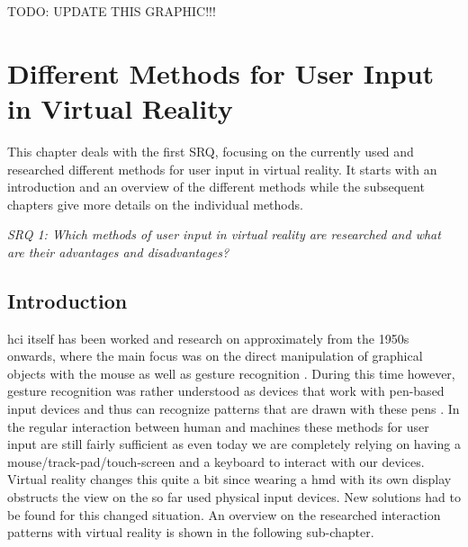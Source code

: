 TODO: UPDATE THIS GRAPHIC!!!



\section{Different Methods for User Input in Virtual Reality}

\label{SectionLiteratureReviewSRQ1}

This chapter deals with the first SRQ, focusing on the currently used and researched different methods for user input in virtual reality. It starts with an introduction and an overview of the different methods while the subsequent chapters give more details on the individual methods.
\begin{framed}
	\textit{SRQ 1: Which methods of user input in virtual reality are researched and what are their advantages and disadvantages?}
\end{framed}

\subsection{Introduction}

\gls{hci} itself has been worked and research on approximately from the 1950s onwards, where the main focus was on the direct manipulation of graphical objects with the mouse as well as gesture recognition \citep{Myers1998}. During this time however, gesture recognition was rather understood as devices that work with pen-based input devices and thus can recognize patterns that are drawn with these pens \citep{Myers1998}. In the regular interaction between human and machines these methods for user input are still fairly sufficient as even today we are completely relying on having a mouse/track-pad/touch-screen and a keyboard to interact with our devices. \newline
Virtual reality changes this quite a bit since wearing a \gls{hmd} with its own display obstructs the view on the so far used physical input devices. New solutions had to be found for this changed situation. An overview on the researched interaction patterns with virtual reality is shown in the following sub-chapter.



